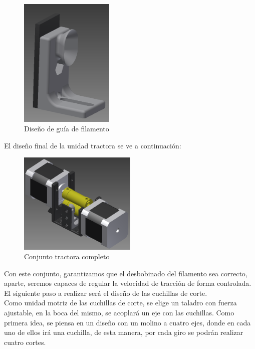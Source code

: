 \begin{figure}[H]
    \centering
    \includegraphics[width=0.4\textwidth]{images/peletizadora/guia.png}
    \caption{Diseño de guía de filamento}
    \label{fig:peletizadora_guia}
\end{figure}

El diseño final de la unidad tractora se ve a continuación:

\begin{figure}[H]
    \centering
    \includegraphics[width=0.5\textwidth]{images/peletizadora/conjunto_tractora.png}
    \caption{Conjunto tractora completo}
    \label{fig:peletizadora_conjunto}
\end{figure}

Con este conjunto, garantizamos que el desbobinado del filamento sea correcto, aparte, seremos capaces de regular la velocidad de tracción de forma controlada. El siguiente paso a realizar será el diseño de las cuchillas de corte.\\

Como unidad motriz de las cuchillas de corte, se elige un taladro con fuerza ajustable, en la boca del mismo, se acoplará un eje con las cuchillas. Como primera idea, se piensa en un diseño con un molino a cuatro ejes, donde en cada uno de ellos irá una cuchilla, de esta manera, por cada giro se podrán realizar cuatro cortes.

